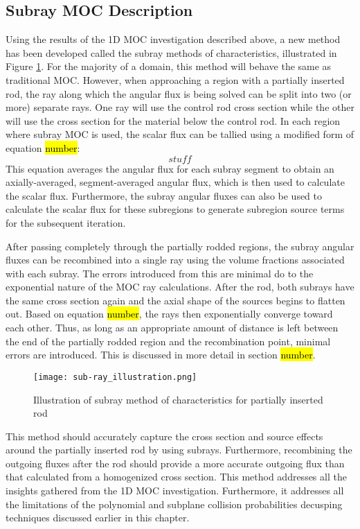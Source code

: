 \subsection{Subray MOC Description}

Using the results of the 1D MOC investigation described above, a new method has been developed called the subray methods of characteristics, illustrated in Figure \ref{f:subrayMOC}.  For the majority of a domain, this method will behave the same as traditional MOC.  However, when approaching a region with a partially inserted rod, the ray along which the angular flux is being solved can be split into two (or more) separate rays.  One ray will use the control rod cross section while the other will use the cross section for the material below the control rod.  In each region where subray MOC is used, the scalar flux can be tallied using a modified form of equation \hl{number}:
\begin{equation}
stuff
\end{equation}
This equation averages the angular flux for each subray segment to obtain an axially-averaged, segment-averaged angular flux, which is then used to calculate the scalar flux.  Furthermore, the subray angular fluxes can also be used to calculate the scalar flux for these subregions to generate subregion source terms for the subsequent iteration.

After passing completely through the partially rodded regions, the subray angular fluxes can be recombined into a single ray using the volume fractions associated with each subray.  The errors introduced from this are minimal do to the exponential nature of the MOC ray calculations.  After the rod, both subrays have the same cross section again and the axial shape of the sources begins to flatten out.  Based on equation \hl{number}, the rays then exponentially converge toward each other.  Thus, as long as an appropriate amount of distance is left between the end of the partially rodded region and the recombination point, minimal errors are introduced.  This is discussed in more detail in section \hl{number}.

\begin{figure}
    \centering
    \texttt{[image: sub-ray\_illustration.png]}
    \caption{Illustration of subray method of characteristics for partially inserted rod}\label{f:subrayMOC}
\end{figure}

This method should accurately capture the cross section and source effects around the partially inserted rod by using subrays.  Furthermore, recombining the outgoing fluxes after the rod should provide a more accurate outgoing flux than that calculated from a homogenized cross section.  This method addresses all the insights gathered from the 1D MOC investigation.  Furthermore, it addresses all the limitations of the polynomial and subplane collision probabilities decusping techniques discussed earlier in this chapter.

